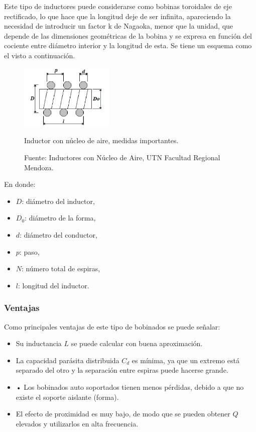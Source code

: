 \documentclass{article}
\begin{document}
Este tipo de inductores puede considerarse como bobinas toroidales de eje rectificado, lo que hace que la longitud deje de ser infinita, apareciendo la necesidad de introducir un factor k de Nagaoka, menor que la unidad, que depende de las dimensiones geométricas de la bobina y se expresa en función del cociente entre diámetro interior y la longitud de esta.
\newpage
Se tiene un esquema como el visto a continuación.
\begin{figure}[H]
\centering
\includegraphics[width=0.4\textwidth]{./img/figura8.png}
\caption{Inductor con núcleo de aire, medidas importantes.}
\caption*{Fuente: Inductores con Núcleo de Aire, UTN Facultad Regional Mendoza.}
\label{fig:circuito8}
\end{figure}
\noindent En donde:
\begin{itemize}
    \item $D$: diámetro del inductor,
    \item $D_0$: diámetro de la forma,
    \item $d$: diámetro del conductor,
    \item $p$: paso,
    \item $N$: número total de espiras,
    \item $l$: longitud del inductor.
\end{itemize}
\subsubsection{Ventajas}
Como principales ventajas de este tipo de bobinados se puede señalar:
\begin{itemize}
    \item Su inductancia $L$ se puede calcular con buena aproximación.
    \item La capacidad parásita distribuida $C_d$ es mínima, ya que un extremo está separado del otro y la separación entre espiras puede hacerse grande.
    \item •	Los bobinados auto soportados tienen menos pérdidas, debido a que no existe el soporte aislante (forma).
    \item El efecto de proximidad es muy bajo, de modo que se pueden obtener $Q$ elevados y utilizarlos en alta frecuencia.
\end{itemize}
\end{document}
